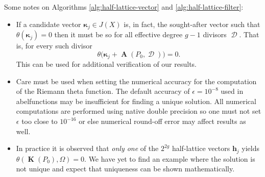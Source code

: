 \documentclass[12pt]{article}
\theoremstyle{definition}
\DeclareMathOperator{\DivD}{\mathcal{D}}
\DeclareMathOperator{\RCV}{\boldsymbol{K}}
\DeclareMathOperator{\Abel}{\boldsymbol{A}}
\begin{document}
Some notes on Algorithms \ref{alg:half-lattice-vector} and
\ref{alg:half-lattice-filter}:
\begin{itemize}
  \item If a candidate vector $\boldsymbol{\kappa}_j \in J(X)$ is, in
    fact, the sought-after vector such that
    $\theta(\boldsymbol{\kappa}_j) = 0$ then it must be so for all
    effective degree $g-1$ divisors $\DivD$. That is, for every such
    divisor
    \begin{equation}
      \theta\big(\boldsymbol{\kappa}_j + \Abel(P_0,\DivD)\big) = 0.
    \end{equation}
    This can be used for additional verification of our results.
  \item Care must be used when setting the numerical accuracy for the
    computation of the Riemann theta function. The default accuracy of
    $\epsilon = 10^{-8}$ used in {\sc abelfunctions} may be insufficient
    for finding a unique solution. All numerical computations are
    performed using native double precision so one must not set
    $\epsilon$ too close to $10^{-16}$ or else numerical round-off error
    may affect results as well.
  \item In practice it is observed that {\it only one} of the $2^{2g}$
    half-lattice vectors $\boldsymbol{h}_j$ yields
    $\theta(\RCV(P_0),\Omega) = 0$. We have yet to find an example where
    the solution is not unique and expect that uniqueness can be shown
    mathematically.
\end{itemize}
\end{document}
